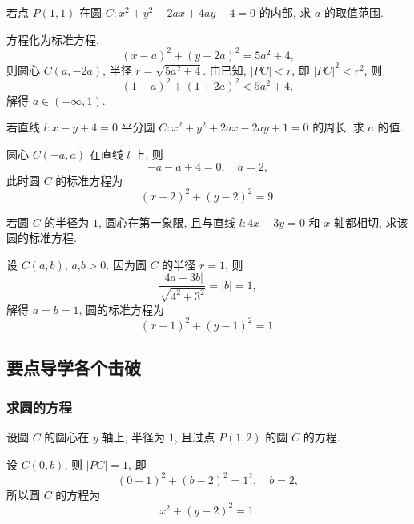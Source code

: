 \begin{exercise}
    若点 $P(1,1)$ 在圆 $C\colon x^2 +y^2 -2ax+4ay-4=0$ 的内部, 求 $a$ 的取值范围.
\end{exercise}
\beginsolution
    方程化为标准方程,
    \[(x-a)^2+(y+2a)^2= 5a^2+4,\]
    则圆心 $C(a,-2a)$, 半径 $r=\sqrt{5a^2+4}$. 由已知, $|PC|< r$, 即 $|PC|^2< r^2$, 则
    \[(1-a)^2+ (1+2a)^2< 5a^2+4,\]
    解得 $a\in(-\infty,1)$.
\endsolution

\begin{exercise}
    若直线 $l\colon x-y+4=0$ 平分圆 $C\colon x^2 +y^2 +2ax-2ay+1=0$ 的周长, 求 $a$ 的值.
\end{exercise}
\beginsolution
    圆心 $C(-a,a)$ 在直线 $l$ 上, 则
    \[-a-a+4= 0,\quad a=2,\]
    此时圆 $C$ 的标准方程为
    \[(x+2)^2+ (y-2)^2= 9.\]
\endsolution

\begin{exercise}
    若圆 $C$ 的半径为 $1$, 圆心在第一象限, 且与直线 $l\colon 4x-3y=0$ 和 $x$ 轴都相切, 求该圆的标准方程.
\end{exercise}
\beginsolution
    设 $C(a,b)$, $a$,$b>0$. 因为圆 $C$ 的半径 $r=1$, 则
    \[\frac{|4a- 3b|}{\sqrt{4^2+3^2}}= |b|= 1,\]
    解得 $a=b=1$, 圆的标准方程为
    \[(x-1)^2+ (y-1)^2= 1.\]
\endsolution

\subsection{要点导学\quad 各个击破}

\subsubsection{求圆的方程}
\begin{example}
    设圆 $C$ 的圆心在 $y$ 轴上, 半径为 $1$, 且过点 $P(1,2)$ 的圆 $C$ 的方程.
\end{example}
\beginsolution
    设 $C(0,b)$, 则 $|PC|=1$, 即
    \[(0-1)^2+ (b-2)^2= 1^2,\quad b=2,\]
    所以圆 $C$ 的方程为
    \[x^2+(y-2)^2=1.\]
\endsolution

